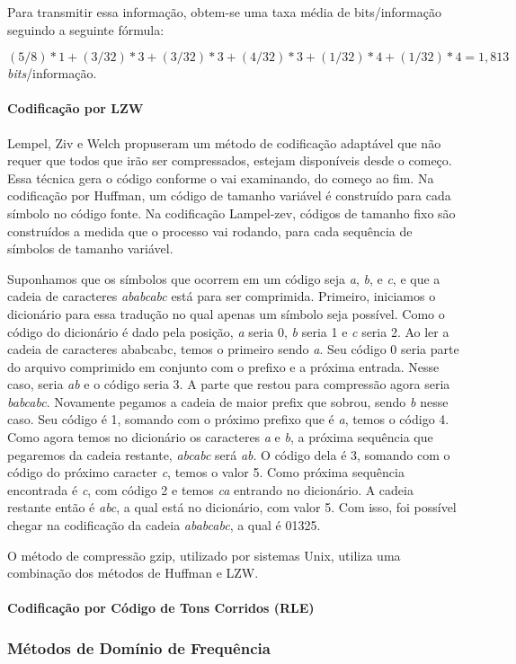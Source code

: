 Para transmitir essa informação, obtem-se uma taxa média de bits/informação seguindo a seguinte fórmula:

\[ (5/8)*1 + (3/32)*3 + (3/32)*3 + (4/32)*3 + (1/32)*4 + (1/32)*4 = 1,813 \] {\em bits}/informação.

\paragraph{Codificação por LZW}
\label{sss.lzw}

Lempel, Ziv e Welch propuseram um método de codificação adaptável que não requer que todos que irão ser compressados, estejam disponíveis desde o começo. Essa técnica gera o código conforme o vai examinando, do começo ao fim. Na codificação por Huffman, um código de tamanho variável é construído para cada símbolo no código fonte. Na codificação Lampel-zev, códigos de tamanho fixo são construídos a medida que o processo vai rodando, para cada sequência de símbolos de tamanho variável.

Suponhamos que os símbolos que ocorrem em um código seja {\em a}, {\em b}, e {\em c}, e que a cadeia de caracteres {\em ababcabc} está para ser comprimida. Primeiro, iniciamos o dicionário para essa tradução no qual apenas um símbolo seja possível. Como o código do dicionário é dado pela posição, {\em a} seria 0, {\em b} seria 1 e {\em c} seria 2. Ao ler a cadeia de caracteres ababcabc, temos o primeiro sendo {\em a}. Seu código 0 seria parte do arquivo comprimido em conjunto com o prefixo e a próxima entrada. Nesse caso, seria {\em ab} e o código seria 3. A parte que restou para compressão agora seria {\em babcabc}. Novamente pegamos a cadeia de maior prefix que sobrou, sendo {\em b} nesse caso. Seu código é 1, somando com o próximo prefixo que é {\em a}, temos o código 4. Como agora temos no dicionário os caracteres {\em a} e {\em b}, a próxima sequência que pegaremos da cadeia restante, {\em abcabc} será {\em ab}. O código dela é 3, somando com o código do próximo caracter {\em c}, temos o valor 5. Como próxima sequência encontrada é {\em c}, com código 2 e temos {\em ca} entrando no dicionário. A cadeia restante então é {\em abc}, a qual está no dicionário, com valor 5. Com isso, foi possível chegar na codificação da cadeia {\em ababcabc}, a qual é 01325.

O método de compressão gzip, utilizado por sistemas Unix, utiliza uma combinação dos métodos de Huffman e LZW.

\paragraph{Codificação por Código de Tons Corridos (RLE)}
\label{sss.runlength}

\subsubsection{Métodos de Domínio de Frequência}
\label{sss.transformmethod}
%
%
